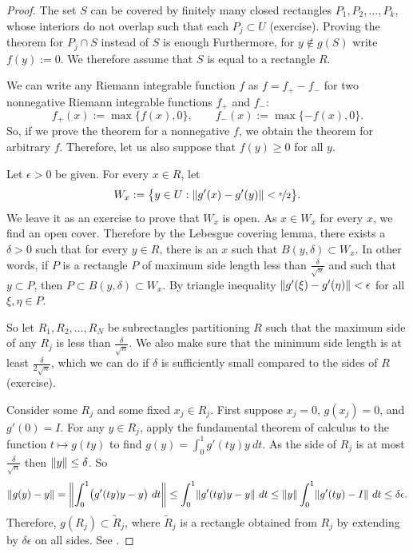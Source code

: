 \begin{proof}

The set $S$ can be covered by finitely many closed rectangles
$P_1,P_2,\ldots,P_k$, whose
interiors do not overlap such that each $P_j \subset U$
(exercise).
Proving the theorem for $P_j \cap S$ instead of $S$ is enough
Furthermore, for $y \notin g(S)$ write $f(y) := 0$.
We therefore assume that $S$ is equal to a rectangle $R$.

We can write any Riemann integrable function $f$ as
$f = f_+ - f_-$ for two nonnegative Riemann integrable
functions $f_+$ and $f_-$:
\begin{equation*}
f_+(x) := \max \{ f(x) , 0 \}, \qquad
f_-(x) := \max \{ -f(x) , 0 \} .
\end{equation*}
So, if we prove the theorem for a nonnegative $f$,
we obtain the theorem for arbitrary $f$.
Therefore, let us also suppose that 
$f(y) \geq 0$ for all $y$.

Let $\epsilon > 0$ be given.
For every $x \in R$, let
\begin{equation*}
W_x := \bigl\{ y \in U : \lVert {g'(x)-g'(y)} \rVert < \nicefrac{\epsilon}{2} \bigr\} .
\end{equation*}
We leave it as an exercise to prove that $W_x$ is open.
As $x \in W_x$ for every $x$, we find an open cover.  Therefore
by the Lebesgue covering lemma, there exists a $\delta > 0$ such that
for every $y \in R$, there is an $x$ such that $B(y,\delta) \subset W_x$.
In other words, if $P$ is a rectangle $P$ of maximum side length less
than $\frac{\delta}{\sqrt{n}}$ and such that $y \subset P$, then $P \subset
B(y,\delta) \subset W_x$.  By triangle inequality
$\lVert {g'(\xi)-g'(\eta)} \rVert < \epsilon$ for all $\xi, \eta \in P$.

So let $R_1,R_2,\ldots,R_N$ be subrectangles partitioning $R$ such that
the maximum side of any $R_j$ is less than
$\frac{\delta}{\sqrt{n}}$.
We also make sure that the minimum side length is at least
$\frac{\delta}{2\sqrt{n}}$, which we can do if $\delta$ is 
sufficiently small compared to the sides of $R$ (exercise).

Consider some $R_j$ and some fixed $x_j \in R_j$.
First suppose $x_j=0$, $g(x_j) = 0$, and $g'(0) = I$.
For any $y \in R_j$,
apply the fundamental theorem of calculus
to the function $t \mapsto g(ty)$ to find
$g(y) = \int_0^1 g'(ty)y ~dt$.  As the
side of $R_j$ is at most $\frac{\delta}{\sqrt{n}}$
then $\lVert {y} \rVert \leq \delta$.  So
\begin{equation*}
\lVert {g(y)-y} \rVert =
\left\lVert {\int_0^1 \bigl(g'(ty) y - y\bigr) ~dt} \right\rVert \leq
\int_0^1 \lVert {g'(ty) y - y} \rVert ~dt \leq
\lVert {y} \rVert \int_0^1 \lVert {g'(ty) - I} \rVert ~dt
\leq
\delta \epsilon .
\end{equation*}
Therefore, $g(R_j) \subset \widetilde{R}_j$, where
$\widetilde{R}_j$ is a rectangle obtained from
$R_j$ by extending by
$\delta \epsilon$ on all sides.  See .


\end{proof}
